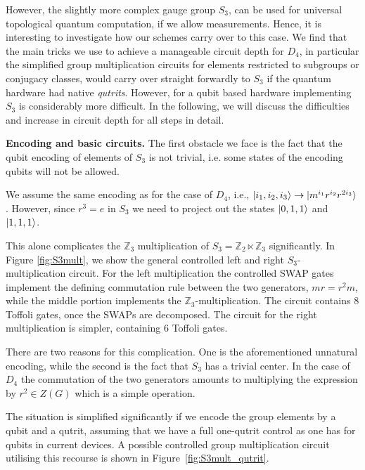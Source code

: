 \documentclass[a4paper,twocolumn,11pt, accepted=2024-06-14]{quantumarticle}
\begin{document}
However, the slightly more complex gauge group $S_3$, can be used for universal topological quantum computation, if we allow measurements. Hence, it is interesting to investigate how our schemes carry over to this case. We find that the main tricks we use to achieve a manageable circuit depth for $D_4$, in particular the simplified group multiplication circuits for elements restricted to subgroups or conjugacy classes, would carry over straight forwardly to $S_3$ if the quantum hardware had native \emph{qutrits}. However, for a qubit based hardware implementing $S_3$ is considerably more difficult. In the following, we will discuss the difficulties and increase in circuit depth for all steps in detail. 

\textbf{Encoding and basic circuits.} The first obstacle we face is the fact that the qubit encoding of elements of $S_3$ is not trivial, i.e. some states of the encoding qubits will not be allowed.

We assume the same encoding as for the case of $D_4$, i.e., $\ket{i_1,i_2,i_3} \to \ket{m^{i_1}r^{i_2}r^{2 i_3}}$. However, since $r^3 = e$ in $S_3$ we need to project out the states $\ket{0,1,1}$ and $\ket{1,1,1}$.

This alone complicates the $\mathbb{Z}_3$ multiplication of $S_3 = \mathbb{Z}_2 \ltimes \mathbb{Z}_3$ significantly. In Figure \ref{fig:S3mult}, we show the general controlled left and right $S_3$-multiplication circuit. For the left multiplication the controlled SWAP gates implement the defining commutation rule between the two generators, $mr = r^2m$, while the middle portion implements the $\mathbb{Z}_3$-multiplication. The circuit contains 8 Toffoli gates, once the SWAPs are decomposed. The circuit for the right multiplication is simpler, containing 6 Toffoli gates.

There are two reasons for this complication. One is the aforementioned unnatural encoding, while the second is the fact that $S_3$ has a trivial center. In the case of $D_4$ the commutation of the two generators amounts to multiplying the expression by $r^2 \in Z(G)$ which is a simple operation.

The situation is simplified significantly if we encode the group elements by a qubit and a qutrit, assuming that we have a full one-qutrit control as one has for qubits in current devices. A possible controlled group multiplication circuit utilising this recourse is shown in Figure~\ref{fig:S3mult_qutrit}.
 
\end{document}
